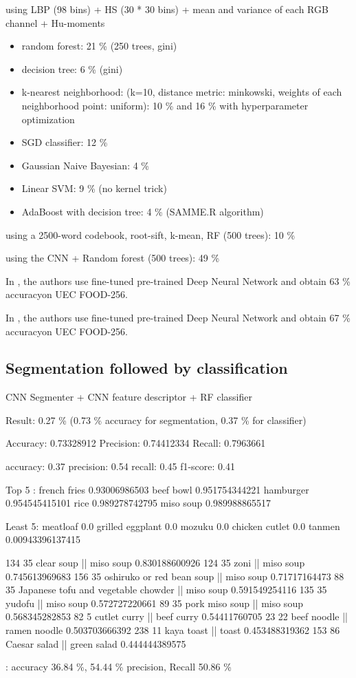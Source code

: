 using LBP (98 bins) + HS (30 * 30 bins) + mean and variance of each RGB channel + Hu-moments
\begin{itemize}
    \item random forest: 21 \% (250 trees, gini)
    \item decision tree: 6 \% (gini)
    \item k-nearest neighborhood: (k=10, distance metric: minkowski, weights of each neighborhood point: uniform): 10 \% and 16 \% with hyperparameter optimization
    \item SGD classifier:  12 \%
    \item Gaussian Naive Bayesian: 4 \%
    \item Linear SVM: 9 \% (no kernel trick)
    \item AdaBoost with decision tree: 4 \% (SAMME.R algorithm)
\end{itemize}

using a 2500-word codebook, root-sift, k-mean, RF (500 trees): 10 \% 

using the CNN + Random forest (500 trees): 49 \%

In \cite{Bolanos2016}, the authors use fine-tuned pre-trained Deep Neural Network and obtain 63 \% accuracyon UEC FOOD-256.

In \cite{Yanai2015}, the authors use fine-tuned pre-trained Deep Neural Network and obtain 67 \% accuracyon UEC FOOD-256.


\subsection{Segmentation followed by classification}

CNN Segmenter + CNN feature descriptor + RF classifier

Result: 0.27 \% (0.73 \% accuracy for segmentation, 0.37 \% for classifier)

Accuracy: 0.73328912
Precision: 0.74412334
Recall:  0.7963661

accuracy: 0.37
precision: 0.54
recall: 0.45
f1-score: 0.41

Top 5 :
french fries 0.93006986503
beef bowl 0.951754344221
hamburger 0.954545415101
rice 0.989278742795
miso soup 0.989988865517

Least 5:
meatloaf 0.0
grilled eggplant 0.0
mozuku 0.0
chicken cutlet 0.0
tanmen 0.00943396137415

134 35 clear soup || miso soup 0.830188600926
124 35 zoni || miso soup 0.745613969683
156 35 oshiruko or red bean soup || miso soup 0.71717164473
88 35 Japanese tofu and vegetable chowder || miso soup 0.591549254116
135 35 yudofu || miso soup 0.572727220661
89 35 pork miso soup || miso soup 0.568345282853
82 5 cutlet curry || beef curry 0.54411760705
23 22 beef noodle || ramen noodle 0.503703666392
238 11 kaya toast || toast 0.453488319362
153 86 Caesar salad || green salad 0.444444389575

\cite{Bolanos2016} : accuracy 36.84 \%, 54.44 \% precision, Recall 50.86 \%


